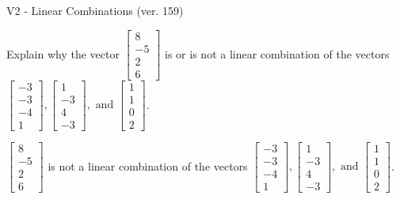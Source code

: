 \begin{exercise}
  \begin{exerciseTitle}V2 - Linear Combinations (ver. 159)\end{exerciseTitle}
  \begin{exerciseStatement}
    Explain why the vector \(\left[\begin{array}{c}
8 \\
-5 \\
2 \\
6
\end{array}\right]\)  is or is not a linear 
	combination of the vectors \(\left[\begin{array}{c}
-3 \\
-3 \\
-4 \\
1
\end{array}\right] , \left[\begin{array}{c}
1 \\
-3 \\
4 \\
-3
\end{array}\right] , \text{ and } \left[\begin{array}{c}
1 \\
1 \\
0 \\
2
\end{array}\right]\).
	


  \end{exerciseStatement}
  \begin{exerciseAnswer}
   \(\left[\begin{array}{c}
8 \\
-5 \\
2 \\
6
\end{array}\right]\) 
  	 is not  
	a linear combination of the vectors \(\left[\begin{array}{c}
-3 \\
-3 \\
-4 \\
1
\end{array}\right] , \left[\begin{array}{c}
1 \\
-3 \\
4 \\
-3
\end{array}\right] , \text{ and } \left[\begin{array}{c}
1 \\
1 \\
0 \\
2
\end{array}\right]\).

	
  


  \end{exerciseAnswer}
\end{exercise}